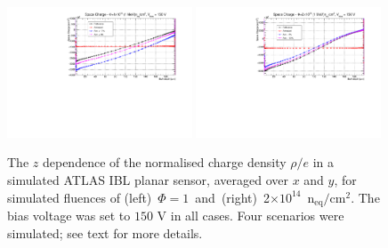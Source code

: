 \begin{figure}[!htpb]
\centering
\includegraphics[width=0.49\textwidth]{TCAD_SpaceCharge_variations_1e14_150V.pdf}
\includegraphics[width=0.49\textwidth]{TCAD_SpaceCharge_variations_2e14_150V.pdf}
\caption{\label{fig:NeffTCADAnnealing}The $z$ dependence of the normalised charge density $\rho/e$ in a simulated ATLAS IBL planar sensor, averaged over $x$ and $y$, for  simulated
  fluences of (left)~$\Phi=1$~and~(right)~2$\times10^{14}$~n$_\text{eq}/\text{cm}^{2}$. The bias voltage was set to $150$ V in all cases. Four scenarios were simulated; see text for more 
  details.}
\end{figure}


